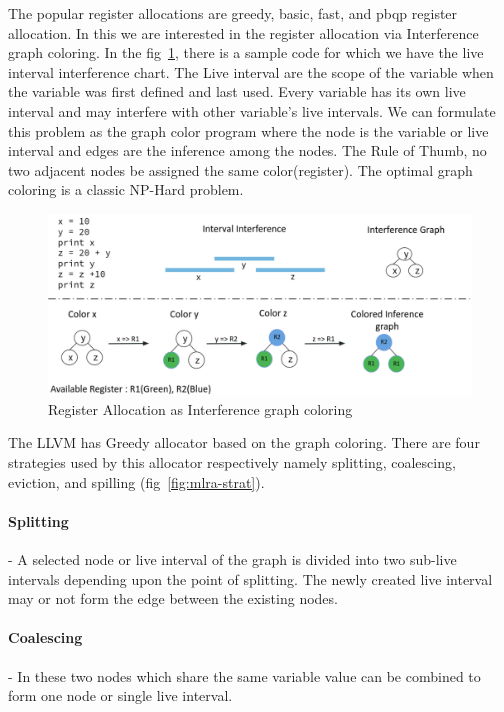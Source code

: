The popular register allocations are greedy, basic, fast, and pbqp register allocation. In this we are interested in the register allocation via Interference graph coloring. In the fig~\ref{fig:mlra-coloring}, there is a sample code for which we have the live interval interference chart. The Live interval are the scope of the variable when the variable was first defined and last used. Every variable has its own live interval and may interfere with other variable's live intervals. We can formulate this problem as the graph color program where the node is the variable or live interval and edges are the inference among the nodes. The Rule of Thumb, no two adjacent nodes be assigned the same color(register). The optimal graph coloring is a classic NP-Hard problem. 

\begin{figure}[t]
    \centering
    \includegraphics[scale=0.4]{figures/chapter-5/mlra_coloring.png}
    \caption{Register Allocation as Interference graph coloring}
     \label{fig:mlra-coloring}
\end{figure}
The LLVM has Greedy allocator  based on the graph coloring. There are four strategies used by this allocator respectively namely splitting, coalescing, eviction, and spilling (fig~\ref{fig:mlra-strat}). 

\paragraph{Splitting} - A selected node or live interval of the graph is divided into two sub-live intervals depending upon the point of splitting. The newly created live interval may or not form the edge between the existing nodes.

\paragraph{Coalescing} - In these two nodes which share the same variable value can be combined to form one node or single live interval. 


